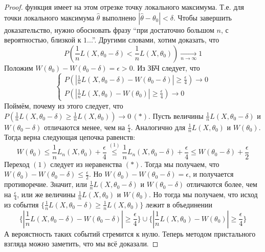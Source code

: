 \begin{proof}
    функция имеет на этом отрезке точку локального максимума. Т.е. для точки локального максимума $\hat{\theta}$ выполнено $|\hat{\theta} - \theta_0| < \delta$.
    Чтобы завершить доказательство, нужно обосновать фразу ``при достаточно большом $n$, с вероятностью, близкой к $1$...''.
    Другими словами, хотим доказать, что
    \[
        P\left( \frac{1}{n} L(X, \theta_0 - \delta) < \frac{1}{n} L(X, \theta_0) \right) \xrightarrow[n \to \infty]{} 1
    \]
    Положим $W(\theta_0) - W(\theta_0 - \delta) = \epsilon > 0$. Из ЗБЧ следует, что
    \[
        \begin{cases}
            P\left(\left| \frac{1}{n} L(X, \theta_0 - \delta) - W(\theta_0 - \delta) \right| \geq \frac{\epsilon}{4} \right) \to 0\\
            P\left( \left| \frac{1}{n} L(X, \theta_0) - W(\theta_0) \right| \geq \frac{\epsilon}{4} \right) \to 0
        \end{cases}
    \]
    Поймём, почему из этого следует, что $P\left(\frac{1}{n} L(X, \theta_0 - \delta) \geq  \frac{1}{n} L(X, \theta_0)\right) \to 0 \, (*)$.
    Пусть величины $\frac{1}{n} L(X, \theta_0 - \delta)$ и $W(\theta_0 - \delta)$ отличаются менее, чем на $\frac{\epsilon}{4}$. Аналогично для
    $\frac{1}{n} L(X, \theta_0)$ и $W(\theta_0)$. Тогда верна следующая цепочка равенств:
    \[
        W(\theta_0) \leq \frac{1}{n}L_n(X, \theta_0) + \frac{\epsilon}{4} \overset{(1)}{\leq} \frac{1}{n}L_n(X, \theta_0 - \delta) + \frac{\epsilon}{4}
        \leq W(\theta_0 - \delta) + \frac{\epsilon}{2}
    \]
    Переход $(1)$ следует из неравенства $(*)$. Тогда мы получаем, что $W(\theta_0) - W(\theta_0 - \delta) \leq \frac{\epsilon}{2}$. Но
    $W(\theta_0) - W(\theta_0 - \delta) = \epsilon$, и получается противоречие. Значит, или
    $\frac{1}{n} L(X, \theta_0 - \delta)$ и $W(\theta_0 - \delta)$ отличаются более, чем на $\frac{\epsilon}{4}$, или же величины
    $\frac{1}{n} L(X, \theta_0)$ и $W(\theta_0)$. Но тогда мы получаем, что исход из события
    $\{\frac{1}{n} L(X, \theta_0 - \delta) \geq  \frac{1}{n} L(X, \theta_0)\}$ лежит в объединении
    \[
        \{\left| \frac{1}{n} L(X, \theta_0 - \delta) - W(\theta_0 - \delta) \right| \geq \frac{\epsilon}{4}\}
        \cup
        \{\left| \frac{1}{n} L(X, \theta_0) - W(\theta_0) \right| \geq \frac{\epsilon}{4}\}
    \]
    А вероястность таких событий стремится к нулю. Теперь методом пристального взгляда можно заметить, что мы всё доказали.
\end{proof}
